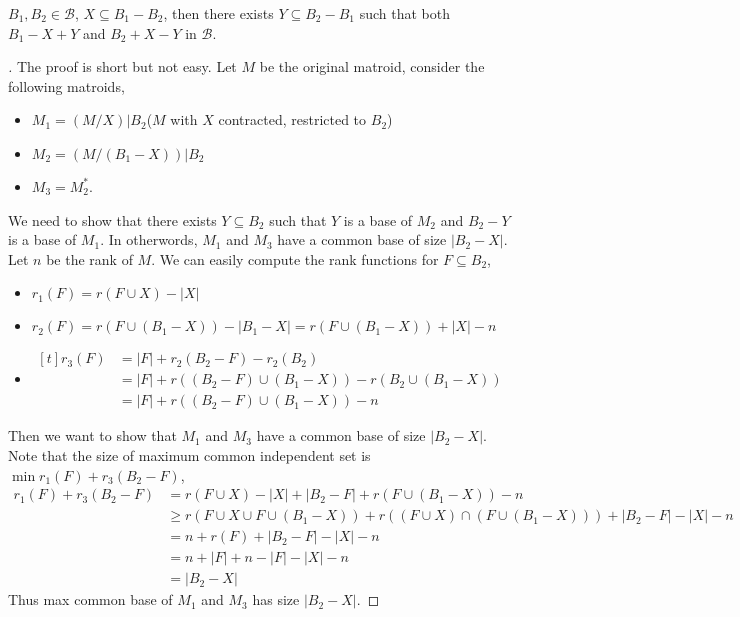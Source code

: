 \begin{theorem}
    $B_1,B_2\in \mathcal B$, $X\subseteq B_1-B_2$, then there exists $Y\subseteq B_2-B_1$ such that both $B_1-X+Y$ and $B_2+X-Y$ in $\mathcal{B}$.
\end{theorem}
\begin{proof}[\cite{Woodall_1974}]
    The proof is short but not easy. Let $M$ be the original matroid, consider the following matroids,
    \begin{itemize}
        \item $M_1=(M/X)|B_2$($M$ with $X$ contracted, restricted to $B_2$)
        \item $M_2=(M/(B_1-X))|B_2$
        \item $M_3=M_2^*$.
    \end{itemize}
    We need to show that there exists $Y\subseteq B_2$ such that $Y$ is a base of $M_2$ and $B_2-Y$ is a base of $M_1$. In otherwords, $M_1$ and $M_3$ have a common base of size $|B_2-X|$.
    Let $n$ be the rank of $M$. We can easily compute the rank functions for $F\subseteq B_2$,
    \begin{itemize}
        \item $r_1(F)=r(F\cup X)-|X|$
        \item $r_2(F)=r(F\cup( B_1-X))-|B_1-X|=r(F\cup (B_1-X))+|X|-n$
        \item $\begin{aligned}[t]
                r_3(F)&=|F|+r_2(B_2-F)-r_2(B_2)\\
                    &= |F|+ r((B_2-F)\cup(B_1-X))-r(B_2\cup (B_1-X))\\
                    &=|F| + r((B_2-F)\cup(B_1-X))-n
            \end{aligned}$
    \end{itemize}
    Then we want to show that $M_1$ and $M_3$ have a common base of size $|B_2-X|$. Note that the size of maximum common independent set is $\min r_1(F)+r_3(B_2-F)$,
    \begin{align*}
        r_1(F)+r_3(B_2-F) &= r(F\cup X)-|X|+|B_2-F| + r(F\cup(B_1-X))-n\\
                        &\geq r(F\cup X\cup F\cup(B_1-X))+r((F\cup X)\cap (F\cup(B_1-X)))+|B_2-F|-|X|-n\\
                        &= n+r(F)+|B_2-F|-|X|-n\\
                        &=n+|F|+n-|F|-|X|-n\\
                        &=|B_2-X|
    \end{align*}
    Thus max common base of $M_1$ and $M_3$ has size $|B_2-X|$.
\end{proof}
